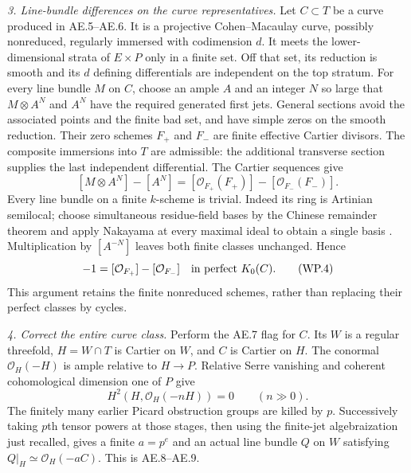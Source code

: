 \emph{3. Line-bundle differences on the curve representatives.}
Let $C\subset T$ be a curve produced in AE.5--AE.6.  It is a
projective Cohen--Macaulay curve, possibly nonreduced, regularly
immersed with codimension $d$.  It meets the lower-dimensional
strata of $E\times P$ only in a finite set.  Off that set, its
reduction is smooth and its $d$ defining differentials are independent
on the top stratum.
For every line bundle $M$ on $C$, choose an ample $A$ and an integer
$N$ so large that $M\otimes A^N$ and $A^N$ have the required generated
first jets.  General sections avoid the associated points and the
finite bad set, and have simple zeros on the smooth reduction.
Their zero schemes $F_+$ and $F_-$ are finite effective Cartier
divisors.  The composite immersions into $T$ are admissible: the
additional transverse section supplies the last independent
differential.  The Cartier sequences give
\[
 [M\otimes A^N]-[A^N]
   =[\mathcal O_{F_+}(F_+)]-[\mathcal O_{F_-}(F_-)].
\]
Every line bundle on a finite $k$-scheme is trivial.  Indeed its
ring is Artinian semilocal; choose simultaneous residue-field bases
by the Chinese remainder theorem and apply Nakayama at every maximal
ideal to obtain a single basis
\citep[Lemma 10.78.7 and proof hints]{frWPStacksSemilocal}.
Multiplication by $[A^{-N}]$ leaves both finite classes unchanged.
Hence
\begin{equation}
 [M]-1=[\mathcal O_{F_+}]-[\mathcal O_{F_-}]
                  \quad\hbox{in perfect }K_0(C).      \tag{WP.4}
\end{equation}
This argument retains the finite nonreduced schemes, rather than
replacing their perfect classes by cycles.

\emph{4. Correct the entire curve class.}
Perform the AE.7 flag for $C$.  Its $W$ is a regular threefold,
$H=W\cap T$ is Cartier on $W$, and $C$ is Cartier on $H$.
The conormal $\mathcal O_H(-H)$ is ample relative to $H\to P$.
Relative Serre vanishing and coherent cohomological dimension one
of $P$ give
\[
                    H^2(H,\mathcal O_H(-nH))=0
                         \qquad(n\gg0).
\]
The finitely many earlier Picard obstruction groups are killed by
$p$.  Successively taking $p$th tensor powers at those stages, then
using the finite-jet algebraization just recalled, gives a finite
$a=p^e$ and an actual line bundle $Q$ on $W$ satisfying
$Q|_H\simeq\mathcal O_H(-aC)$.  This is AE.8--AE.9.

